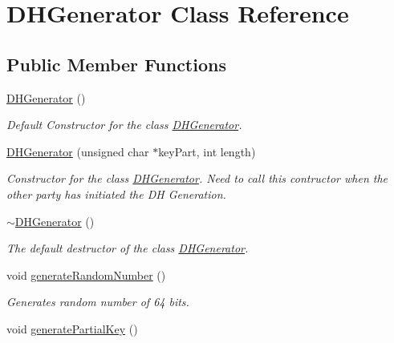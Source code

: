 \hypertarget{classDHGenerator}{
\section{DHGenerator Class Reference}
\label{classDHGenerator}
}
\subsection*{Public Member Functions}
\begin{DoxyCompactItemize}
\item 
\hypertarget{classDHGenerator_a325ce323e49cd4ad4c457c5fbeac98d2}{
\hyperlink{classDHGenerator_a325ce323e49cd4ad4c457c5fbeac98d2}{DHGenerator} ()}
\label{classDHGenerator_a325ce323e49cd4ad4c457c5fbeac98d2}

\begin{DoxyCompactList}\small\item\em Default Constructor for the class \hyperlink{classDHGenerator}{DHGenerator}. \item\end{DoxyCompactList}\item 
\hyperlink{classDHGenerator_aec089023908d2653236591a24a232551}{DHGenerator} (unsigned char $\ast$keyPart, int length)
\begin{DoxyCompactList}\small\item\em Constructor for the class \hyperlink{classDHGenerator}{DHGenerator}. Need to call this contructor when the other party has initiated the DH Generation. \item\end{DoxyCompactList}\item 
\hypertarget{classDHGenerator_a6db2eb57efea55c28cad7a5c9b993660}{
\hyperlink{classDHGenerator_a6db2eb57efea55c28cad7a5c9b993660}{$\sim$DHGenerator} ()}
\label{classDHGenerator_a6db2eb57efea55c28cad7a5c9b993660}

\begin{DoxyCompactList}\small\item\em The default destructor of the class \hyperlink{classDHGenerator}{DHGenerator}. \item\end{DoxyCompactList}\item 
\hypertarget{classDHGenerator_a56e0ebd5198a03930e0300dc0c77cfd6}{
void \hyperlink{classDHGenerator_a56e0ebd5198a03930e0300dc0c77cfd6}{generateRandomNumber} ()}
\label{classDHGenerator_a56e0ebd5198a03930e0300dc0c77cfd6}

\begin{DoxyCompactList}\small\item\em Generates random number of 64 bits. \item\end{DoxyCompactList}\item 
\hypertarget{classDHGenerator_a9159dd7f184511f387a97005ee5ffdf7}{
void \hyperlink{classDHGenerator_a9159dd7f184511f387a97005ee5ffdf7}{generatePartialKey} ()}
\label{classDHGenerator_a9159dd7f184511f387a97005ee5ffdf7}


\end{DoxyCompactItemize}
